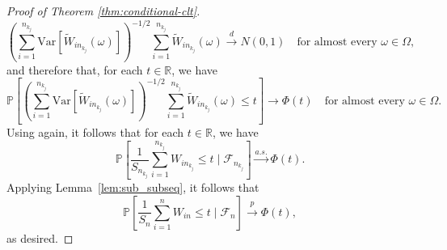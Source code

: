 \documentclass[12pt]{article}
\theoremstyle{definition}
\theoremstyle{remark}
\newcommand{\V}{\mathrm{Var}}							%
\newcommand{\R}{\mathbb{R}}								%
\newcommand{\convp}{\overset p \rightarrow}             %
\newcommand{\convd}{\overset d \rightarrow}             %
\newcommand{\convas}{\overset {a.s.} \rightarrow}       %
\begin{document}
\begin{proof}[Proof of Theorem \ref{thm:conditional-clt}]
		\begin{equation}
			\left(\sum_{i = 1}^{n_{k_j}} \V[\widetilde W_{in_{k_j}}(\omega)]\right)^{-1/2}\sum_{i = 1}^{n_{k_j}} \widetilde W_{in_{k_j}}(\omega) \convd N(0,1) \quad \text{for almost every } \omega \in \Omega,
		\end{equation}
		and therefore that, for each $t \in \R$, we have 
		\begin{equation}
			\mathbb P\left[\left(\sum_{i = 1}^{n_{k_j}} \V[\widetilde W_{in_{k_j}}(\omega)]\right)^{-1/2}\sum_{i = 1}^{n_{k_j}} \widetilde W_{in_{k_j}}(\omega) \leq t\right] \rightarrow \Phi(t) \quad \text{for almost every } \omega \in \Omega.
		\end{equation}
		Using \citet[Theorem 8.38]{Lista2017} again, it follows that for each $t \in \R$, we have
		\begin{equation}
			\mathbb P\left[\frac{1}{S_{n_{k_j}}}\sum_{i = 1}^{n_{k_j}} W_{in_{k_j}} \leq t \mid \mathcal F_{n_{k_j}}\right] \convas \Phi(t).
		\end{equation}
		Applying Lemma~\ref{lem:sub_subseq}, it follows that
		\begin{equation}
			\mathbb P\left[\frac{1}{S_{n}}\sum_{i = 1}^{n} W_{in} \leq t \mid \mathcal F_{n}\right] \convp \Phi(t),
		\end{equation}
		as desired.
	\end{proof}
	
\end{document}
